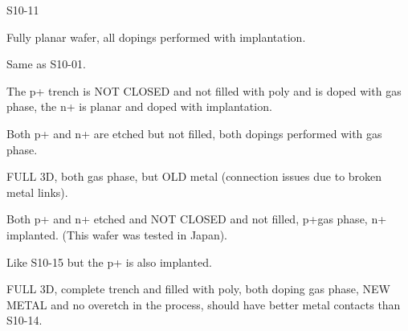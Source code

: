 \documentclass[../main/thesis.tex]{subfiles}
\begin{document}
\begin{labeling}{S10-11}
	\item [S10-01] Fully planar wafer, all dopings performed with implantation.
	\item [S10-02] Same as S10-01.
	\item [S10-04] The p+ trench is NOT CLOSED and not filled with poly and is doped with gas phase, the n+ is planar and doped with implantation.
	\item [S10-11] Both p+ and n+ are etched but not filled, both dopings performed with gas phase.
	\item [S10-14] FULL 3D, both gas phase, but OLD metal (connection issues due to broken metal links).
	\item [S10-15] Both p+ and n+ etched and NOT CLOSED and not filled, p+gas phase, n+ implanted. (This wafer was tested in Japan).
	\item [S10-16] Like S10-15 but the p+ is also implanted.
	\item [S10-17] FULL 3D, complete trench and filled with poly, both doping gas phase, NEW METAL and no overetch in the process, should have better metal contacts than S10-14.
\end{labeling}
\end{document}

